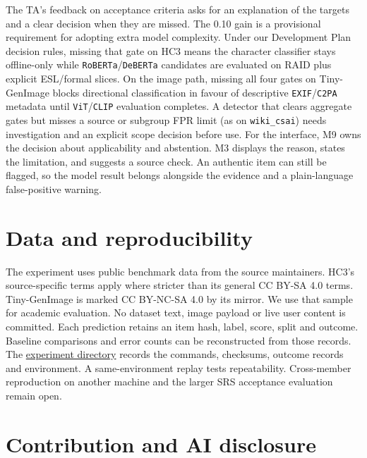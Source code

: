 \documentclass[11pt]{article}
\newcommand{\repo}{https://github.com/richy1337/Verity}
\begin{document}
The TA's feedback on acceptance criteria asks for an explanation of the targets and a clear decision when they are missed. The 0.10 gain is a provisional requirement for adopting extra model complexity. Under our Development Plan decision rules, missing that gate on HC3 means the character classifier stays offline-only while \texttt{RoBERTa}/\texttt{DeBERTa} candidates are evaluated on RAID plus explicit ESL/formal slices. On the image path, missing all four gates on Tiny-GenImage blocks directional classification in favour of descriptive \texttt{EXIF}/\texttt{C2PA} metadata until \texttt{ViT}/\texttt{CLIP} evaluation completes. A detector that clears aggregate gates but misses a source or subgroup FPR limit (as on \texttt{wiki\_csai}) needs investigation and an explicit scope decision before use. For the interface, M9 owns the decision about applicability and abstention. M3 displays the reason, states the limitation, and suggests a source check. An authentic item can still be flagged, so the model result belongs alongside the evidence and a plain-language false-positive warning.

\section{Data and reproducibility}

The experiment uses public benchmark data from the source maintainers. HC3's source-specific terms apply where stricter than its general CC BY-SA 4.0 terms. Tiny-GenImage is marked CC BY-NC-SA 4.0 by its mirror. We use that sample for academic evaluation. No dataset text, image payload or live user content is committed. Each prediction retains an item hash, label, score, split and outcome. Baseline comparisons and error counts can be reconstructed from those records. The \href{\repo/tree/main/docs/CDs/MLReport/experiment}{experiment directory} records the commands, checksums, outcome records and environment. A same-environment replay tests repeatability. Cross-member reproduction on another machine and the larger SRS acceptance evaluation remain open.

\section*{Contribution and AI disclosure}
\end{document}
